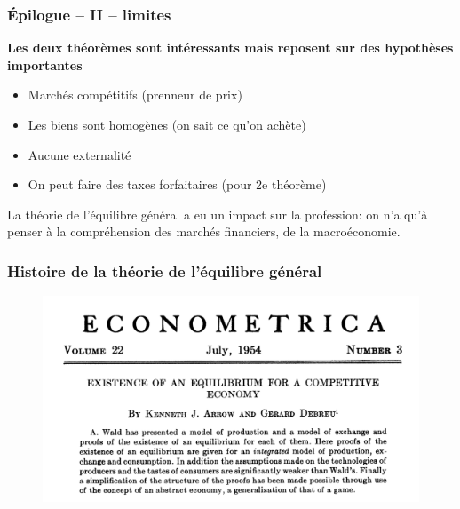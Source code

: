 \documentclass[handout]{beamer}
\newenvironment{iPar}[1]{\textbf{#1} \begin{itemize}}{\end{itemize}}
\newcommand{\mdp}{\medskip \pause}
\begin{document}
\begin{frame}\frametitle{Épilogue -- II -- limites}

\begin{iPar}{Les deux théorèmes sont intéressants mais reposent sur des hypothèses importantes} 
\item Marchés compétitifs (prenneur de prix) \item Les biens sont homogènes (on sait ce qu'on achète) \item Aucune externalité
\item On peut faire des taxes forfaitaires (pour 2e théorème)\end{iPar}\mdp

La théorie de l'équilibre général a eu un impact sur la profession: on n'a qu'à penser à la compréhension des marchés financiers, de la macroéconomie. 

\end{frame}

\begin{frame}\frametitle{Histoire de la théorie de l'équilibre général}

\begin{figure}
\centering
\includegraphics[scale=0.5]{ad1954.png}
\end{figure}

\end{frame}
\end{document}
